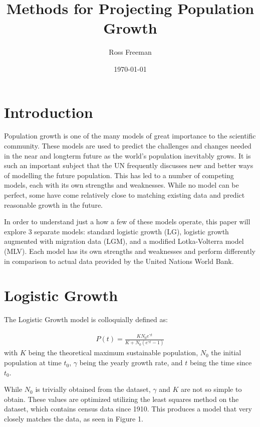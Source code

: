 \documentclass{article}
\begin{document}
\title{Methods for Projecting Population Growth}
\author{Ross Freeman}
\date{\today}
\maketitle
\section{Introduction}

Population growth is one of the many models of great importance to the scientific community. These models are used to predict the challenges and changes needed in the near and longterm future as the world's population inevitably grows. It is such an important subject that the UN frequently discusses new and better ways of modelling the future population. This has led to a number of competing models, each with its own strengths and weaknesses. While no model can be perfect, some have come relatively close to matching existing data and predict reasonable growth in the future. 

In order to understand just a how a few of these models operate, this paper will explore 3 separate models: standard logistic growth (LG), logistic growth augmented with migration data (LGM), and a modified Lotka-Volterra model (MLV). Each model has its own strengths and weaknesses and perform differently in comparison to actual data provided by the United Nations World Bank.

\section{Logistic Growth}

The Logistic Growth model is colloquially defined as:

\begin{align}
\label{eq:log-growth}
	P(t) = \frac{K N_0 e^{\gamma t}}{K + N_0 (e^{\gamma t} - 1)}
\end{align}
with $K$ being the theoretical maximum sustainable population, $N_0$ the initial population at time $t_0$, $\gamma$ being the yearly growth rate, and $t$ being the time since $t_0$.

While $N_0$ is trivially obtained from the dataset, $\gamma$ and $K$ are not so simple to obtain. These values are optimized utilizing the least squares method on the dataset, which contains census data since 1910. This produces a model that very closely matches the data, as seen in Figure 1.
\end{document}
